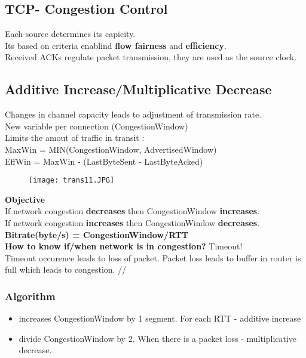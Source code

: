\documentclass[../resumosRCOM.tex]{subfiles}
\begin{document}
\subsection{TCP- Congestion Control}
Each source determines its capicity.\\
Its based on criteria enablind \textbf{flow fairness} and \textbf{efficiency}.\\
Received ACKs regulate packet transmission, they are used as the source clock.\\

\subsection{Additive Increase/Multiplicative Decrease}
Changes in channel capacity leads to adjustment of transmission rate.\\
New variable per connection (CongestionWindow)\\
Limits the amout of traffic in transit :\\
MaxWin = MIN(CongestionWindow, AdvertisedWindow)\\
EffWin = MaxWin - (LastByteSent - LastByteAcked)\\

\begin{figure}[h]
    \centering
    \texttt{[image: trans11.JPG]}
\end{figure}

\textbf{Objective}\\
If network congestion \textbf{decreases} then CongestionWindow \textbf{increases}.\\
If network congestion \textbf{increases} then CongestionWindow \textbf{decreases}.\\
\textbf{Bitrate(byte/s) = CongestionWindow/RTT}\\

\textbf{How to know if/when network is in congestion?} Timeout!\\
Timeout occurence leads to loss of packet. Packet loss leads to buffer in router is full which leads to congestion. //

\subsubsection{Algorithm}
\begin{itemize}
    \item increases CongestionWindow by 1 segment. For each RTT - additive increase
    \item divide CongestionWindow by 2. When there is a packet loss - multiplicative decrease.
\end{itemize}
\end{document}
